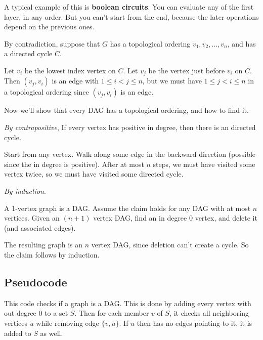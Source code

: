 \documentclass[12pt]{article}
\begin{document}
  A typical example of this is {\bf boolean circuits}. You can evaluate any of
  the first layer, in any order. But you can't start from the end, because the
  later operations depend on the previous ones.

  {
    By contradiction, suppose that $G$ has a topological ordering $v_1, v_2,
    ..., v_n$, and has a directed cycle $C$.

    Let $v_i$ be the lowest index vertex on $C$. Let $v_j$ be the vertex just
    before $v_i$ on $C$. Then $(v_j, v_i)$ is an edge with $1 \le i < j \le n$,
    but we must have $1 \le j < i \le n$ in a topological ordering since $(v_j,
    v_i)$ is an edge.

  }

  Now we'll show that every DAG has a topological ordering, and how to find it.

  {
    {\it By contrapositive}, If every vertex has positive in degree, then there
    is an directed cycle.

    Start from any vertex. Walk along some edge in the backward direction (possible
    since the in degree is positive). After at most $n$ steps, we must have visited
    some vertex twice, so we must have visited some directed cycle.
  }

  {
    {\it By induction}.

    \induction
    {
      A 1-vertex graph is a DAG.
    }
    {
      Assume the claim holds for any DAG with at most $n$ vertices.
    }
    {
      Given an $(n + 1)$ vertex DAG, find an in degree $0$ vertex, and delete it
      (and associated edges).
    }

    The resulting graph is an $n$ vertex DAG, since deletion can't create a cycle.
    So the claim follows by induction.
  }



  \subsection {Pseudocode}
  This code checks if a graph is a DAG. This is done by adding every vertex with
  out degree $0$ to a set $S$. Then for each member $v$ of $S$, it checks all
  neighboring vertices $u$ while removing edge $\{v, u\}$. If $u$ then has no
  edges pointing to it, it is added to $S$ as well. 
\end{document}
